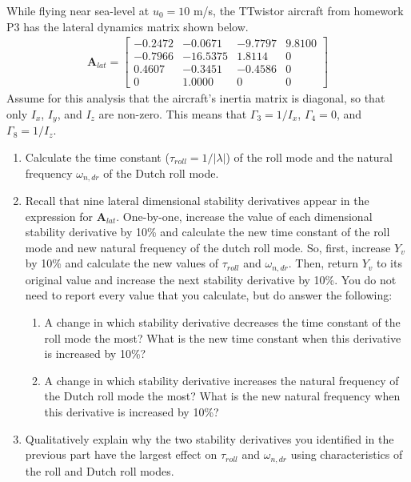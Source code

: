\begin{question}
    While flying near sea-level at $u_0 = 10$ m/s, the TTwistor aircraft from homework P3 has the lateral dynamics matrix shown below.
    \begin{align*}
        \mathbf{A}_{lat} = 
        \begin{bmatrix}
         -0.2472 & -0.0671 & -9.7797 & 9.8100 \\
         -0.7966 & -16.5375 & 1.8114 & 0 \\
         0.4607 & -0.3451 & -0.4586 &  0 \\
         0 & 1.0000 & 0 & 0
        \end{bmatrix}
    \end{align*}
    Assume for this analysis that the aircraft's inertia matrix is diagonal, so that only $I_x$, $I_y$, and $I_z$ are non-zero. This means that $\Gamma_3 = 1/I_x$, $\Gamma_4 = 0$, and $\Gamma_8 = 1/I_z$.

    \begin{enumerate}
        \item Calculate the time constant ($\tau_{roll} = 1/|\lambda|$) of the roll mode and the natural frequency $\omega_{n,dr}$ of the Dutch roll mode.
        \item Recall that nine lateral dimensional stability derivatives appear in the expression for $\mathbf{A}_{lat}$. One-by-one, increase the value of each dimensional stability derivative by 10\% and calculate the new time constant of the roll mode and new natural frequency of the dutch roll mode. So, first, increase $Y_v$ by 10\% and calculate the new values of $\tau_{roll}$ and $\omega_{n,dr}$. Then, return $Y_v$ to its original value and increase the next stability derivative by 10\%. You do not need to report every value that you calculate, but do answer the following:
        \begin{enumerate}
            \item A change in which stability derivative decreases the time constant of the roll mode the most? What is the new time constant when this derivative is increased by 10\%?
            \item A change in which stability derivative increases the natural frequency of the Dutch roll mode the most? What is the new natural frequency when this derivative is increased by 10\%?
        \end{enumerate}
        \item Qualitatively explain why the two stability derivatives you identified in the previous part have the largest effect on $\tau_{roll}$ and $\omega_{n,dr}$ using characteristics of the roll and Dutch roll modes.
    \end{enumerate}
\end{question}
